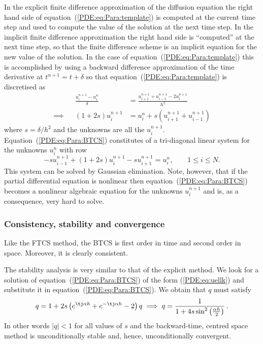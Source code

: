 In the explicit finite difference approximation of the diffusion
equation the right hand side of equation~(\ref{PDE:eq:Para:template})
is computed at the current time step and used to compute the value of
the solution at the next time step.  In the implicit finite difference
approximation the right hand side is ``computed'' at the next time
step, so that the finite difference scheme is an implicit equation for
the new value of the solution.  In the case of
equation~(\ref{PDE:eq:Para:template}) this is accomplished by using a
backward difference approximation of the time derivative at
$t^{n+1}=t+\delta$ so that equation~(\ref{PDE:eq:Para:template}) is
discretised as
%
\begin{align}
 && \frac{u_{i}^{n+1} - u_{i}^{n}}{\delta} & =
       \frac{u_{i+1}^{n+1}+u_{i-1}^{n+1}-2u_{i}^{n+1}}{h^2} \nonumber \\
 \implies && (1+2s) u_{i}^{n+1} & = u_{i}^{n} + s
 (u_{i+1}^{n+1}+u_{i-1}^{n+1})
 \label{PDE:eq:Para:BTCS}
\end{align}
%
where $s = \delta/h^2$ and the unknowns are all the $u_{i}^{n+1}$.
Equation~(\ref{PDE:eq:Para:BTCS}) constitutes of a tri-diagonal linear
system for the unknowns $u_{i}^{n}$ with row
%
\begin{equation*}
  -s u_{i-1}^{n+1} + (1+2s) u_{i}^{n+1} - s u_{i+1}^{n+1} = u_{i}^{n},
  \qquad 1 \le i \le N .
\end{equation*}
%
This system can be solved by Gaussian elimination.  Note, however,
that if the partial differential equation is nonlinear then
equation~(\ref{PDE:eq:Para:BTCS}) becomes a nonlinear algebraic
equation for the unknowns $u_{i}^{n+1}$ and is, as a consequence, very
hard to solve.

\subsubsection{Consistency, stability and convergence}

Like the FTCS method, the BTCS is first order in time and second order
in space.  Moreover, it is clearly consistent.

The stability analysis is very similar to that of the explicit method.
We look for a solution of equation~(\ref{PDE:eq:Para:BTCS}) of the
form (\ref{PDE:eq:uellk}) and substitute it in
equation~(\ref{PDE:eq:Para:BTCS}).  We obtain that $q$ must satisfy
%
\begin{equation*}
  q = 1 + 2 s \left ( e^{\tj \alpha h} + e^{-\tj \alpha h} - 2 \right ) q \implies
  q = \frac{1}{1 + 4 s \sin^2 \left ( \frac{\alpha h}{2} \right )} \, .
\end{equation*}
%
In other words $|q| < 1$ for all values of $s$ and the backward-time,
centred space method is unconditionally stable and, hence,
unconditionally convergent.

